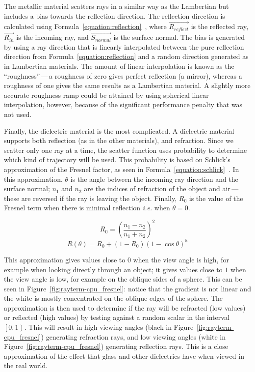 The metallic material scatters rays in a similar way as the Lambertian but includes a bias towards the reflection direction.
The reflection direction is calculated using Formula~\ref{equation:reflection}~\cite{prunier2017shading}, where $\vec{R_{reflect}}$ is the reflected ray, $\vec{R_{in}}$ is the incoming ray, and $\vec{S_{normal}}$ is the surface normal.
The bias is generated by using a ray direction that is linearly interpolated between the pure reflection direction from Formula~\ref{equation:reflection} and a random direction generated as in Lambertian materials.
The amount of linear interpolation is known as the ``roughness''\,---\,a roughness of zero gives perfect reflection (a mirror), whereas a roughness of one gives the same results as a Lambertian material.
A slightly more accurate roughness ramp could be attained by using spherical linear interpolation, however, because of the significant performance penalty that was not used.

Finally, the dielectric material is the most complicated.
A dielectric material supports both reflection (as in the other materials), and refraction.
Since we scatter only one ray at a time, the scatter function uses probability to determine which kind of trajectory will be used.
This probability is based on Schlick's approximation of the Fresnel factor, as seen in Formula~\ref{equation:schlick}~\cite{schlick1994inexpensive, learnopengltheory, prunier2017shading}.
In this approximation, $\theta$ is the angle between the incoming ray direction and the surface normal; $n_1$ and $n_2$ are the indices of refraction of the object and air\,---\,these are reversed if the ray is leaving the object.
Finally, $R_0$ is the value of the Fresnel term when there is minimal reflection \textit{i.e.} when $\theta = 0$.

\begin{equation}
\label{equation:schlick_base}
  R_0 = (\frac{n_1 - n_2}{n_1 + n_2})^2
\end{equation}
\begin{equation}
\label{equation:schlick}
  R(\theta) = R_0 + (1 - R_0)(1 - \cos{\theta})^5
\end{equation}

This approximation gives values close to $0$ when the view angle is high, for example when looking directly through an object; it gives values close to $1$ when the view angle is low, for example on the oblique sides of a sphere.
This can be seen in Figure~\ref{fig:rayterm-cpu_fresnel}: notice that the gradient is not linear and the white is mostly concentrated on the oblique edges of the sphere.
The approximation is then used to determine if the ray will be refracted (low values) or reflected (high values) by testing against a random scalar in the interval $\left[0, 1\right)$.
This will result in high viewing angles (black in Figure~\ref{fig:rayterm-cpu_fresnel}) generating refraction rays, and low viewing angles (white in Figure~\ref{fig:rayterm-cpu_fresnel}) generating reflection rays.
This is a close approximation of the effect that glass and other dielectrics have when viewed in the real world.


